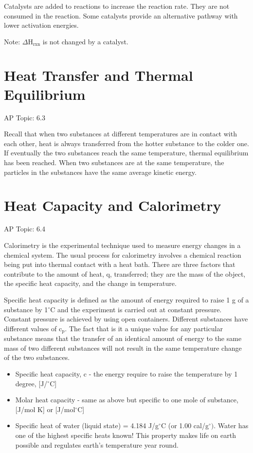 \documentclass[../chem.tex]{subfiles}
\begin{document}
Catalysts are added to reactions to increase the reaction rate. They are not consumed in the reaction. Some catalysts provide an alternative pathway with lower activation energies.

Note: $\Delta$H$_{\text{rxn}}$ is not changed by a catalyst.
\section{Heat Transfer and Thermal Equilibrium}
AP Topic: 6.3

Recall that when two substances at different temperatures are in contact with each other, heat is always transferred from the hotter substance to the 
colder one. If eventually the two substances reach the same temperature, thermal equilibrium has been reached. When two substances are at the same temperature, 
the particles in the substances have the same average kinetic energy.
\section{Heat Capacity and Calorimetry}
AP Topic: 6.4

Calorimetry is the experimental technique used to measure energy changes in a chemical system. The usual process for calorimetry involves a chemical reaction being put into thermal contact with a heat bath.
There are three factors that contribute to the amount of heat, q, transferred; they are the mass of the object, the specific heat capacity, and the change in temperature.

Specific heat capacity is defined as the amount of energy required to raise 1 g of a substance by 1$^{\circ}$C and the experiment is carried out at constant pressure.
Constant pressure is achieved by using open containers. Different substances have different values of c$_{\text{p}}$. The fact that is it a unique value for any 
particular substance means that the transfer of an identical amount of energy to the same mass of two different substances will not result in the same temperature change of the two substances.
\begin{itemize}
    \item Specific heat capacity, c - the energy require to raise the temperature by 1 degree, [J/$^{\circ}$C]
    \item Molar heat capacity - same as above but specific to one mole of substance, [J/mol K] or [J/mol$^{\circ}$C]
    \item Specific heat of water (liquid state) = 4.184 J/g$^{\circ}$C (or 1.00 cal/g$^{\circ})$. Water has one of the highest specific heats known! This property makes life on earth possible and regulates earth's temperature year round.
\end{itemize}
\end{document}
